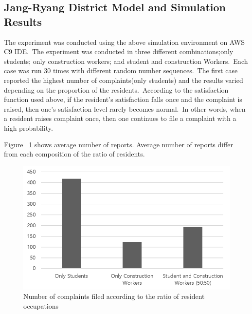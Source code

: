 \documentclass{scsSimAUDPaperFormat}
\begin{document}


\subsection{Jang-Ryang District Model and Simulation Results}

The experiment was conducted using the above simulation environment on AWS C9 IDE.~The experiment was conducted in three different combinations;only students; only construction workers; and student and construction Workers.~Each case was run 30 times with different random number sequences.~The first case reported the highest number of complaints(only students) and the results varied depending on the proportion of the residents.~According to the satisfaction function used above, if the resident's satisfaction falls once and the complaint is raised, then one's satisfaction level rarely becomes normal.~In other words, when a resident raises complaint once, then one continues to file a complaint with a high probability.

Figure ~\ref{Fig:case_result} shows average number of reports. Average number of reports differ from each composition of the ratio of residents.
\begin{figure}[!h]
    \centering
    \includegraphics[width=1.0\columnwidth]{fig/case_study_result.png}
    \caption{Number of complaints filed according to the ratio of resident occupations}
    \label{Fig:case_result}
\end{figure}
\end{document}
